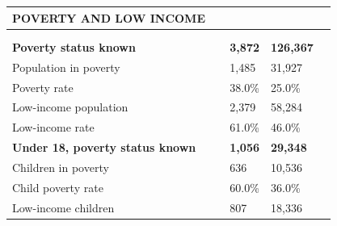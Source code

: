 \documentclass[9pt]{report}
\begin{document}
\vspace{12pt}
\setlength{\tabcolsep}{.01in} %
\begin{tabular}{p{.10in}p{.10in}p{.10in}p{3.7in}>{\hfill}p{.85in}>{\hfill}p{.85in}>{\hfill}p{.85in}>{\hfill}p{.85in}p{0.1in}}
\multicolumn{9}{l}{\parbox{7.1in}{\raggedright{\large{\strut\textbf{POVERTY AND LOW INCOME}\strut}}}} \\ 
\hline
\multicolumn{4}{l}{\parbox{3.5in}{\raggedright{\textbf{}}}} & \multicolumn{1}{r}{\parbox{.85in}{\strut\raggedleft{\textbf{}\strut}}} & \multicolumn{1}{r}{\parbox{.85in}{\strut\raggedleft{\textbf{}\strut}}} & \multicolumn{1}{r}{\parbox{.85in}{\strut{}}} & \multicolumn{1}{r}{\parbox{.85in}{\strut{}}} & \\ 
\multicolumn{9}{l}{} \\ 
\multicolumn{4}{l}{\parbox{3.5in}{\strut\raggedright{\textbf{Poverty status known}\strut}}} & \textbf{} & \textbf{} & \textbf{3,872} & \textbf{126,367} & \textbf{} \\ 
\multicolumn{4}{l}{\parbox{3.6in}{\strut\raggedright{{Population in poverty}}\strut}} &  &  & 1,485 & 31,927 & \multicolumn{1}{l}{}  \\ 
\multicolumn{4}{l}{\parbox{3.6in}{\strut\raggedright{{Poverty rate}}\strut}} &  &  & 38.0\% & 25.0\% & \multicolumn{1}{l}{}  \\ 
\multicolumn{4}{l}{\parbox{3.6in}{\strut\raggedright{{Low-income population}}\strut}} &  &  & 2,379 & 58,284 & \multicolumn{1}{l}{}  \\ 
\multicolumn{4}{l}{\parbox{3.6in}{\strut\raggedright{{Low-income rate}}\strut}} &  &  & 61.0\% & 46.0\% & \multicolumn{1}{l}{}  \\ 
\multicolumn{4}{l}{\parbox{3.5in}{\strut\raggedright{\textbf{Under 18, poverty status known}\strut}}} & \textbf{} & \textbf{} & \textbf{1,056} & \textbf{29,348} & \textbf{} \\ 
\multicolumn{4}{l}{\parbox{3.6in}{\strut\raggedright{{Children in poverty}}\strut}} &  &  & 636 & 10,536 & \multicolumn{1}{l}{}  \\ 
\multicolumn{4}{l}{\parbox{3.6in}{\strut\raggedright{{Child poverty rate}}\strut}} &  &  & 60.0\% & 36.0\% & \multicolumn{1}{l}{}  \\ 
\multicolumn{4}{l}{\parbox{3.6in}{\strut\raggedright{{Low-income children}}\strut}} &  &  & 807 & 18,336 & \multicolumn{1}{l}{}  \\ 

\end{tabular}
\end{document}
